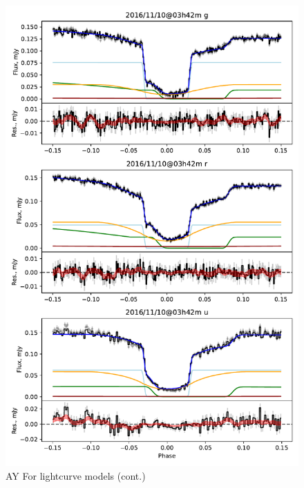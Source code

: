 \begin{figure}
    \centering
    \includegraphics[width=\textwidth]{figures/results/AYFor/AYFor_2.pdf}
    \caption{AY For lightcurve models (cont.)}
    \label{fig:AYFor all lightcurves cont 1}
\end{figure}
